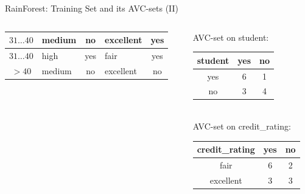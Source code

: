 \begin{frame}{RainForest: Training Set and its AVC-sets (II)}
\begin{columns}
\begin{column}{0.6\textwidth}
\begin{tabular}{|c|l|c|l|c|}
        \cellcolor{yellow!20}$31\ldots40$ & \cellcolor{yellow!20}medium & \cellcolor{yellow!20}no & \cellcolor{yellow!20}excellent & \cellcolor{green!20}yes \\\hline
        \cellcolor{yellow!20}$31\ldots40$ & \cellcolor{yellow!20}high & \cellcolor{yellow!20}yes & \cellcolor{yellow!20}fair & \cellcolor{green!20}yes \\\hline
        \cellcolor{yellow!20}$>40$ & \cellcolor{yellow!20}medium & \cellcolor{yellow!20}no & \cellcolor{yellow!20}excellent & \cellcolor{red!20}no \\\hline
      \end{tabular}
    \end{column}
    \begin{column}{0.3\textwidth}
      \vspace{-3cm}

      \centering
      AVC-set on student:\\
      \begin{tabular}{|c|c|c|}
        \hline
        student & yes & no \\\hline
        yes & 6 & 1 \\\hline
        no & 3 & 4 \\\hline
      \end{tabular}\\[1cm]
      AVC-set on credit\_rating:\\
      \begin{tabular}{|c|c|c|}
        \hline
        credit\_rating & yes & no \\\hline
        fair & 6 & 2 \\\hline
        excellent & 3 & 3 \\\hline
      \end{tabular}
    \end{column}
  \end{columns}
\end{frame}

